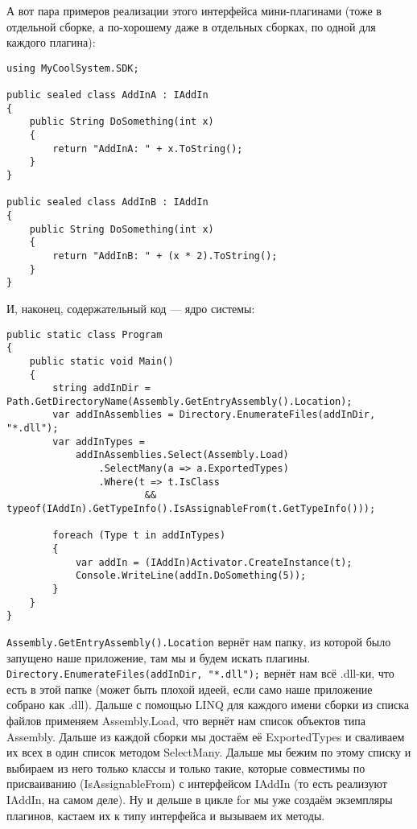 \documentclass[a5paper]{article}
\begin{document}
А вот пара примеров реализации этого интерфейса мини-плагинами (тоже в отдельной сборке, а по-хорошему даже в отдельных сборках, по одной для каждого плагина):

\begin{verbatim}
using MyCoolSystem.SDK;

public sealed class AddInA : IAddIn
{
    public String DoSomething(int x)
    {
        return "AddInA: " + x.ToString();
    }
}

public sealed class AddInB : IAddIn
{
    public String DoSomething(int x)
    {
        return "AddInB: " + (x * 2).ToString();
    }
}
\end{verbatim}

И, наконец, содержательный код --- ядро системы:

\begin{verbatim}
public static class Program
{
    public static void Main()
    {
        string addInDir = Path.GetDirectoryName(Assembly.GetEntryAssembly().Location);
        var addInAssemblies = Directory.EnumerateFiles(addInDir, "*.dll");
        var addInTypes =
            addInAssemblies.Select(Assembly.Load)
                .SelectMany(a => a.ExportedTypes)
                .Where(t => t.IsClass 
                        && typeof(IAddIn).GetTypeInfo().IsAssignableFrom(t.GetTypeInfo()));

        foreach (Type t in addInTypes)
        {
            var addIn = (IAddIn)Activator.CreateInstance(t);
            Console.WriteLine(addIn.DoSomething(5));
        }
    }
}
\end{verbatim}

\texttt{Assembly.GetEntryAssembly().Location} вернёт нам папку, из которой было запущено наше приложение, там мы и будем искать плагины. \texttt{Directory.EnumerateFiles(addInDir, "*.dll");} вернёт нам всё .dll-ки, что есть в этой папке (может быть плохой идеей, если само наше приложение собрано как .dll). Дальше с помощью LINQ для каждого имени сборки из списка файлов применяем Assembly.Load, что вернёт нам список объектов типа Assembly. Дальше из каждой сборки мы достаём её ExportedTypes и сваливаем их всех в один список методом SelectMany. Дальше мы бежим по этому списку и выбираем из него только классы и только такие, которые совместимы по присваиванию (IsAssignableFrom) с интерфейсом IAddIn (то есть реализуют IAddIn, на самом деле). Ну и дельше в цикле for мы уже создаём экземпляры плагинов, кастаем их к типу интерфейса и вызываем их методы.
\end{document}
